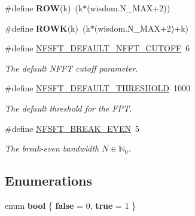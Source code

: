 \begin{CompactItemize}
\item 
\hypertarget{group__nfsft_ga44}{
\#define {\bf ROW}(k)~(k$\ast$(wisdom.N\_\-MAX+2))}
\label{group__nfsft_ga44}

\item 
\hypertarget{group__nfsft_ga45}{
\#define {\bf ROWK}(k)~(k$\ast$(wisdom.N\_\-MAX+2)+k)}
\label{group__nfsft_ga45}

\item 
\#define \hyperlink{group__nfsft_ga46}{NFSFT\_\-DEFAULT\_\-NFFT\_\-CUTOFF}~6
\begin{CompactList}\small\item\em The default NFFT cutoff parameter. \item\end{CompactList}\item 
\#define \hyperlink{group__nfsft_ga47}{NFSFT\_\-DEFAULT\_\-THRESHOLD}~1000
\begin{CompactList}\small\item\em The default threshold for the FPT. \item\end{CompactList}\item 
\#define \hyperlink{group__nfsft_ga48}{NFSFT\_\-BREAK\_\-EVEN}~5
\begin{CompactList}\small\item\em The break-even bandwidth $N \in \mathbb{N}_0$. \item\end{CompactList}\end{CompactItemize}
\subsection*{Enumerations}
\begin{CompactItemize}
\item 
enum {\bf bool} \{ {\bf false} =  0, 
{\bf true} =  1
 \}
\end{CompactItemize}
